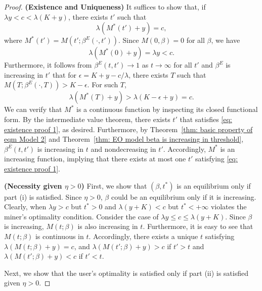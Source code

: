 \documentclass[12pt, letterpaper]{article}
\begin{document}
\begin{proof}
\noindent
\textbf{(Existence and Uniqueness)}
It suffices to show that, if $\lambda y < c < \lambda (K + y)$, there exists $t'$ such that
\begin{equation}\label{eq: existence proof 1}
    \lambda (M^*(t') + y) = c,
\end{equation}
where $M^*(t') = M(t'; \beta^E(\cdot, t'))$.
Since $M(0, \beta) = 0$ for all $\beta$, we have
\begin{equation}
    \lambda (M^*(0) + y) = \lambda y < c.
\end{equation}
Furthermore, it follows from $\beta^E(t, t') \to 1$ as $t \to \infty$ for all $t'$ and $\beta^E$ is increasing in $t'$ that for $\epsilon = K + y - c/\lambda$, there exists $T$ such that $M(T; \beta^E(\cdot, T)) > K - \epsilon$. For such $T$,
\begin{equation}
    \lambda (M^*(T) + y) > \lambda (K - \epsilon + y) = c.
\end{equation}
We can verify that $M^*$ is a continuous function by inspecting its closed functional form. By the intermediate value theorem, there exists $t'$ that satisfies \eqref{eq: existence proof 1}, as desired. Furthermore, by Theorem~\ref{thm: basic property of eqm Model 2} and Theorem~\ref{thm: EO model beta is increasing in threshold}, $\beta^E(t, t')$ is increasing in $t$ and nondecreasing in $t'$. Accordingly, $M^*$ is an increasing function, implying that there exists at most one $t'$ satisfying \eqref{eq: existence proof 1}.





\noindent
\textbf{(Necessity given $\eta > 0$)}
First, we show that $(\beta, t^*)$ is an equilibrium only if part (i) is satisfied. Since $\eta > 0$, $\beta$ could be an equilibrium only if it is increasing. Clearly, when $\lambda y > c$ but $t^* > 0$ and $\lambda (y + K) < c$ but $t^* < + \infty$ violates the miner's optimality condition. Consider the case of $\lambda y \le c \le \lambda (y + K)$. Since $\beta$ is increasing, $M(t; \beta)$ is also increasing in $t$. Furthermore, it is easy to see that $M(t; \beta)$ is continuous in $t$. Accordingly, there exists a unique $t$ satisfying $\lambda (M(t;\beta) + y) = c$, and $\lambda (M(t';\beta) + y) > c$ if $t' > t$ and $\lambda (M(t';\beta) + y) < c$ if $t' < t$.








Next, we show that the user's optimality is satisfied only if part (ii) is satisfied given $\eta > 0$.


\end{proof}
\end{document}
